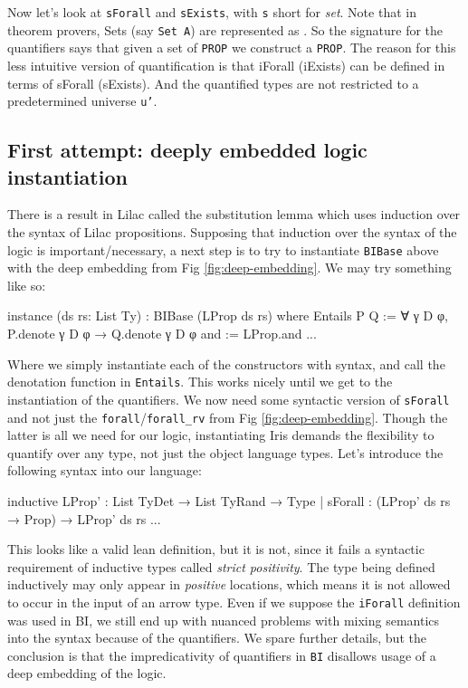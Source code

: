 Now let's look at \texttt{sForall} and \texttt{sExists}, with \texttt{s} short for \emph{set}.  
Note that in theorem provers, Sets (say \texttt{Set A}) are represented as . So the signature for the quantifiers says that given a set
of \texttt{PROP} we construct a \texttt{PROP}. The reason for this less intuitive version of quantification is that iForall (iExists) can be defined in terms of sForall
(sExists). And the quantified types are not restricted to a predetermined universe \texttt{u'}.


\subsection{First attempt: deeply embedded logic instantiation}
There is a result in Lilac \citep[see Appendix B.10]{lilac} called the substitution lemma which uses induction over the syntax of Lilac propositions. Supposing
that induction over the syntax of the logic is important/necessary, a next step is to try to instantiate \texttt{BIBase} above with the deep embedding from Fig 
\ref{fig:deep-embedding}. We may try something like so:

\begin{leancode}
instance (ds rs: List Ty) : BIBase (LProp ds rs) where
  Entails P Q    := ∀ γ D φ, P.denote γ D φ → Q.denote γ D φ
  and            := LProp.and
  ...
\end{leancode}

Where we simply instantiate each of the constructors with syntax, and call the denotation function in \texttt{Entails}. This works nicely until we get to the instantiation
of the quantifiers. We now need some syntactic version of \texttt{sForall} and not just the 
\texttt{forall}/\texttt{forall\_rv} from Fig \ref{fig:deep-embedding}. Though the latter is all we need for our logic, instantiating
Iris demands the flexibility to quantify over any type, not just the object language types. Let's introduce the following syntax into our
language:

\begin{leancode}
inductive LProp' : List TyDet → List TyRand → Type
  | sForall : (LProp' ds rs → Prop) → LProp' ds rs
  ...
\end{leancode}

This looks like a valid lean definition, but it is not, since it fails a syntactic requirement of inductive types called \emph{strict positivity}.
The type being defined inductively may only appear in \emph{positive} locations, which means it is not allowed to occur in the input of an arrow
type. Even if we suppose the \texttt{iForall} definition was used in BI, we still end up with nuanced problems with mixing semantics into the syntax
because of the quantifiers. We spare further details, but the conclusion is that the impredicativity of quantifiers in \texttt{BI}
disallows usage of a deep embedding of the logic.


